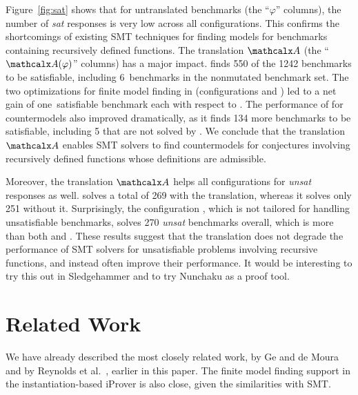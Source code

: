 Figure~\ref{fig:sat} shows that for untranslated benchmarks (the ``$\varphi$''
columns), the number of \emph{sat} responses is very low across all
configurations. This confirms the shortcomings of existing SMT techniques for
finding models for benchmarks containing recursively defined functions.
%
The translation $\conv$ (the ``$\conv(\varphi)$'' columns) has a major
impact. \cvcf finds 550 of the 1242 benchmarks to be satisfiable,
including 6~benchmarks in the nonmutated \leon benchmark set.
The two optimizations for finite model finding in \cvc (configurations \cvcfe and \cvcfm)
led to a net gain of one~satisfiable benchmark each with respect to \cvcf.
The performance of \ziiib for countermodels also improved dramatically, as it
finds 134 more benchmarks to be satisfiable, including 5 that are not solved by \cvcf.
%
We conclude that the translation $\conv$ enables SMT
solvers to find countermodels for conjectures involving recursively defined
functions whose definitions are admissible.

Moreover,
the translation $\conv$ helps all configurations for \emph{unsat} responses as well.
\ziii solves a total of 269 with the translation, whereas it solves only 251 without it.
Surprisingly,
the configuration \cvcf, which is not tailored for handling unsatisfiable benchmarks,
solves 270 \emph{unsat} benchmarks overall, which is more than both \cvcd and \ziii.
These results suggest that the translation does not degrade the performance
of SMT solvers for unsatisfiable problems involving recursive functions,
and instead often improve their performance. It would be interesting to try this
out in Sledgehammer \cite{blanchette-et-al-2013-smt} and to try Nunchaku as a proof tool.

\section{Related Work}
\label{sec:related-work}

We have already described the most closely related work, by Ge and de Moura
\cite{GeDeM-CAV-09} and by Reynolds et al.\
\cite{ReyEtAl-1-RR-13,reynolds-et-al-2013}, earlier in this paper.
The finite model finding support in the instantiation-based iProver
\cite{korovin-2013} is also close, given the similarities with SMT.



